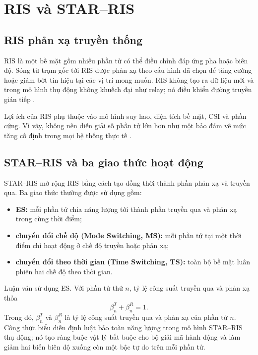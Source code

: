 \section{RIS và STAR--RIS}
\subsection{RIS phản xạ truyền thống}
RIS là một bề mặt gồm nhiều phần tử có thể điều chỉnh đáp ứng pha hoặc biên độ. Sóng từ trạm gốc tới RIS được phản xạ theo cấu hình đã chọn để tăng cường hoặc giảm bớt tín hiệu tại các vị trí mong muốn. RIS không tạo ra dữ liệu mới và trong mô hình thụ động không khuếch đại như relay; nó điều khiển đường truyền gián tiếp \cite{Wu2019IRSBeamforming,DiRenzo2020SmartRadio}.

Lợi ích của RIS phụ thuộc vào mô hình suy hao, diện tích bề mặt, CSI và phần cứng. Vì vậy, không nên diễn giải số phần tử lớn hơn như một bảo đảm về mức tăng cố định trong mọi hệ thống thực tế \cite{Bjornson2020RISMyths,Wu2021IRSTutorial}.

\subsection{STAR--RIS và ba giao thức hoạt động}
STAR--RIS mở rộng RIS bằng cách tạo đồng thời thành phần phản xạ và truyền qua. Ba giao thức thường được sử dụng gồm:
\begin{itemize}
  \item \textbf{ES:} mỗi phần tử chia năng lượng tới thành phần truyền qua và phản xạ trong cùng thời điểm;
  \item \textbf{chuyển đổi chế độ (Mode Switching, MS):} mỗi phần tử tại một thời điểm chỉ hoạt động ở chế độ truyền hoặc phản xạ;
  \item \textbf{chuyển đổi theo thời gian (Time Switching, TS):} toàn bộ bề mặt luân phiên hai chế độ theo thời gian.
\end{itemize}

Luận văn sử dụng ES. Với phần tử thứ $n$, tỷ lệ công suất truyền qua và phản xạ thỏa
\begin{equation}
 \beta_n^T+\beta_n^R=1.
 \label{eq:ch1-es}
\end{equation}
Trong đó, $\beta_n^T$ và $\beta_n^R$ là tỷ lệ công suất truyền qua và phản xạ của phần tử $n$. Công thức biểu diễn định luật bảo toàn năng lượng trong mô hình STAR--RIS thụ động; nó tạo ràng buộc vật lý bắt buộc cho bộ giải mã hành động và làm giảm hai biến biên độ xuống còn một bậc tự do trên mỗi phần tử.

